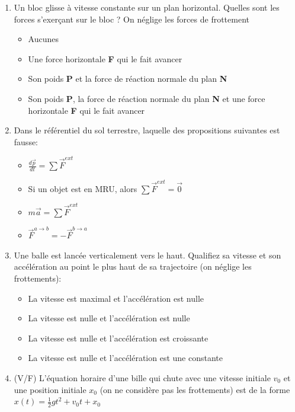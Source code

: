 \documentclass{article}
\begin{document}
\begin{enumerate}

    \item Un bloc glisse à vitesse constante sur un plan horizontal. Quelles sont les forces s'exerçant sur le bloc ? On néglige les forces de frottement
    \begin{itemize}
        \item Aucunes
        \item Une force horizontale \textbf{F} qui le fait avancer
        \item Son poids \textbf{P} et la force de réaction normale du plan \textbf{N} %
        \item Son poids \textbf{P}, la force de réaction normale du plan \textbf{N} et une force horizontale \textbf{F} qui le fait avancer
    \end{itemize}
    
    \item Dans le référentiel du sol terrestre, laquelle des propositions suivantes est fausse:
    \begin{itemize}
        \item $\frac{d\Vec{p}}{dt} = \sum \Vec{F}^{ext}$
        \item Si un objet est en MRU, alors $\sum \Vec{F}^{ext} = \Vec{0}$
        \item $m \Vec{a}= \sum \Vec{F}^{ext}$ %
        \item $\Vec{F}^{a \rightarrow b} = -\Vec{F}^{b \rightarrow a}$ %
    \end{itemize}
    
    \item Une balle est lancée verticalement vers le haut. Qualifiez sa vitesse et son accélération au point le plus haut de sa trajectoire (on néglige les frottements):
    \begin{itemize}
        \item La vitesse est maximal et l'accélération est nulle
        \item La vitesse est nulle et l'accélération est nulle
        \item La vitesse est nulle et l'accélération est croissante
        \item La vitesse est nulle et l'accélération est une constante %
    \end{itemize}

    \item (V/F) L'équation horaire d'une bille qui chute avec une vitesse initiale $v_0$ et une position initiale $x_0$ (on ne considère pas les frottements) est de la forme $x(t) = \frac{1}{2}gt^2+v_0t+x_0$
\end{enumerate}
\end{document}
